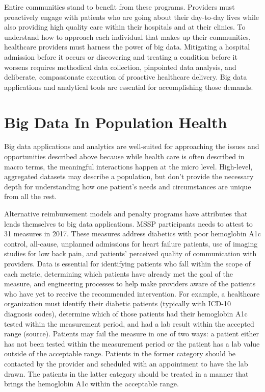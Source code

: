 \documentclass[sigconf]{acmart}
\begin{document}
 Entire communities stand to benefit from these programs. Providers must proactively engage with patients who are going about their day-to-day lives while also providing high quality care within their hospitals and at their clinics. To understand how to approach each individual that makes up their communities, healthcare providers must harness the power of big data. Mitigating a hospital admission before it occurs or discovering and treating a condition before it worsens requires methodical data collection, pinpointed data analysis, and deliberate, compassionate execution of proactive healthcare delivery. Big data applications and analytical tools are essential for accomplishing those demands.

\section{Big Data In Population Health}

 Big data applications and analytics are well-suited for approaching the issues and opportunities described above because while health care is often described in macro terms, the meaningful interactions happen at the micro level. High-level, aggregated datasets may describe a population, but don't provide the necessary depth for understanding how one patient's needs and circumstances are unique from all the rest.

 Alternative reimbursement models and penalty programs have attributes that lends themselves to big data applications. MSSP participants needs to attest to 31 measures in 2017. These measures address diabetics with poor hemoglobin A1c control, all-cause, unplanned admissions for heart failure patients, use of imaging studies for low back pain, and patients' perceived quality of communication with providers\cite{editor07}. Data is essential for identifying patients who fall within the scope of each metric, determining which patients have already met the goal of the measure, and engineering processes to help make providers aware of the patients who have yet to receive the recommended intervention. For example, a healthcare organization must identify their diabetic patients (typically with ICD-10 diagnosis codes), determine which of those patients had their hemoglobin A1c tested within the measurement period, and had a lab result within the accepted range (source). Patients may fail the measure in one of two ways: a patient either has not been tested within the measurement period or the patient has a lab value outside of the acceptable range. Patients in the former category should be contacted by the provider and scheduled with an appointment to have the lab drawn. The patients in the latter category should be treated in a manner that brings the hemoglobin A1c within the acceptable range.
\end{document}
